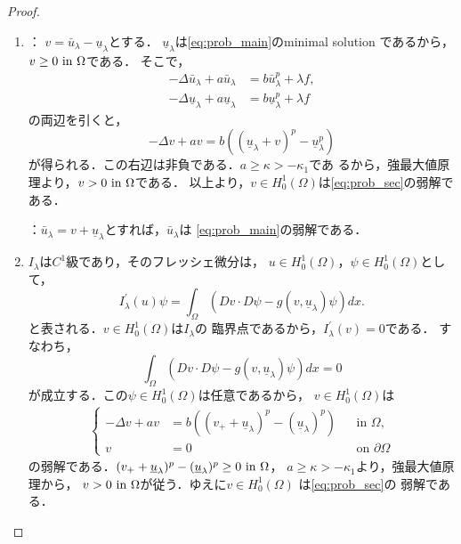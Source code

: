 \begin{proof}
 \begin{enumerate}[1.] \sage
  \item {}：
        $v = \bar{u}_\lambda - \underline{u}_\lambda$とする．
        $\underline{u}_\lambda$は\ref{eq:prob_main}のminimal solution
        であるから，$v \geq 0 ~\text{in}~ \Omega$である．
        そこで，
        \begin{align*}
         -\Delta \bar{u}_\lambda + a \bar{u}_\lambda &= b
         \bar{u}_\lambda^p + \lambda f, \\
         -\Delta \underline{u}_\lambda + a \underline{u}_\lambda &= b
         \underline{u}_\lambda^p + \lambda f
        \end{align*}
        の両辺を引くと，
        \[
        -\Delta v + a v = b \left( (\underline{u}_\lambda + v)^p -
        \underline{u}_\lambda^p \right)
        \]
        が得られる．この右辺は非負である．$a \geq \kappa > -\kappa_1$であ
        るから，強最大値原理より，$v > 0 ~\text{in}~ \Omega$である．
        以上より，$v \in H_0^1(\Omega)$は\ref{eq:prob_sec}の弱解である．

        ：$\bar{u}_\lambda = v +
        \underline{u}_\lambda$とすれば，$\bar{u}_\lambda$は
        \ref{eq:prob_main}の弱解である．
  \item $I_\lambda$は$C^1$級であり，そのフレッシェ微分は，
        $u \in H_0^1(\Omega)$，$\psi \in H_0^1(\Omega)$として，
        \[
         I^\prime_\lambda(u)\psi = \int_\Omega \left( Dv \cdot D\psi -
        g(v, \underline{u}_\lambda) \psi \right) dx.
        \]
        と表される．$v \in H_0^1(\Omega)$は$I_\lambda$の
        臨界点であるから，$I^\prime_\lambda(v) = 0$である．
        すなわち，
        \begin{equation}
         \int_\Omega \left( Dv \cdot D\psi - g(v,
                      \underline{u}_\lambda)\psi \right) dx = 0
         \label{eq:weak_sol_of_heart}        
        \end{equation}
        が成立する．この$\psi \in H_0^1(\Omega)$は任意であるから，
        $v \in H_0^1(\Omega)$は
        \begin{align}
         \left\{
          \begin{aligned}
           -\Delta v + a v &= b \left( (v_+ + \underline{u}_\lambda)^p -
           (\underline{u}_\lambda)^p \right) 
           & &\text{in~} \Omega, \\
           v &= 0 & &\text{on~} \partial\Omega
          \end{aligned}
         \right.
        \end{align}
        の弱解である．$(v_+ + \underline{u}_\lambda)^p -
           (\underline{u}_\lambda)^p \geq 0 ~\text{in}~ \Omega$，
        $a \geq \kappa > -\kappa_1$より，強最大値原理から，
        $v > 0 ~\text{in}~ \Omega$が従う．ゆえに$v \in H_0^1(\Omega)$
        は\ref{eq:prob_sec}の
        弱解である． \qedhere
 \end{enumerate}
\end{proof}

